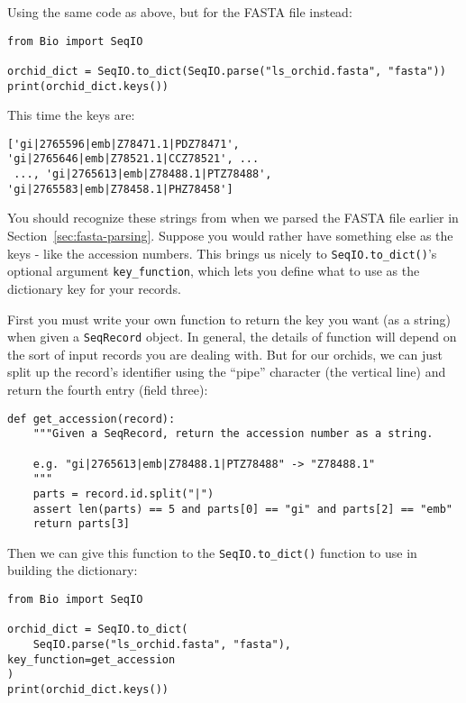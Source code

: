 Using the same code as above, but for the FASTA file instead:

\begin{verbatim}
from Bio import SeqIO

orchid_dict = SeqIO.to_dict(SeqIO.parse("ls_orchid.fasta", "fasta"))
print(orchid_dict.keys())
\end{verbatim}

\noindent This time the keys are:

\begin{verbatim}
['gi|2765596|emb|Z78471.1|PDZ78471', 'gi|2765646|emb|Z78521.1|CCZ78521', ...
 ..., 'gi|2765613|emb|Z78488.1|PTZ78488', 'gi|2765583|emb|Z78458.1|PHZ78458']
\end{verbatim}

You should recognize these strings from when we parsed the FASTA file earlier in Section~\ref{sec:fasta-parsing}.  Suppose you would rather have something else as the keys - like the accession numbers.  This brings us nicely to \verb|SeqIO.to_dict()|'s optional argument \verb|key_function|, which lets you define what to use as the dictionary key for your records.

First you must write your own function to return the key you want (as a string) when given a \verb|SeqRecord| object.  In general, the details of function will depend on the sort of input records you are dealing with.  But for our orchids, we can just split up the record's identifier using the ``pipe'' character (the vertical line) and return the fourth entry (field three):

\begin{verbatim}
def get_accession(record):
    """Given a SeqRecord, return the accession number as a string.

    e.g. "gi|2765613|emb|Z78488.1|PTZ78488" -> "Z78488.1"
    """
    parts = record.id.split("|")
    assert len(parts) == 5 and parts[0] == "gi" and parts[2] == "emb"
    return parts[3]
\end{verbatim}

\noindent Then we can give this function to the \verb|SeqIO.to_dict()| function to use in building the dictionary:

\begin{verbatim}
from Bio import SeqIO

orchid_dict = SeqIO.to_dict(
    SeqIO.parse("ls_orchid.fasta", "fasta"), key_function=get_accession
)
print(orchid_dict.keys())
\end{verbatim}

